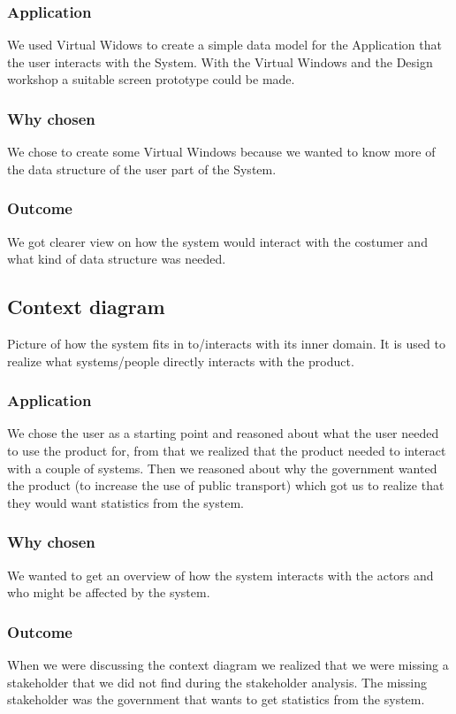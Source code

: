 \documentclass[a4paper]{article}
\begin{document}
      \subsubsection{Application}
        We used Virtual Widows to create a simple data model for the Application that the user interacts with the System. With the Virtual Windows and the Design workshop a suitable screen prototype could be made.
      \subsubsection{Why chosen}
        We chose to create some Virtual Windows because we wanted to know more of the data structure of the user part of the System.
      \subsubsection{Outcome}
        We got clearer view on how the system would interact with the costumer and what kind of data structure was needed.
    \subsection{Context diagram} \label{subsec:context}
	Picture of how the system fits in to/interacts with its inner domain. It is used to realize what systems/people directly interacts with the product.
    \subsubsection{Application}
    We chose the user as a starting point and reasoned about what the user needed to use the product for, from that we realized that the product needed to interact with a couple of systems. Then we reasoned about why the government wanted the product (to increase the use of public transport) which got us to realize that they would want statistics from the system.
    \subsubsection{Why chosen}
    We wanted to get an overview of how the system interacts with the actors and who might be affected by the system.
    \subsubsection{Outcome}
	When we were discussing the context diagram we realized that we were missing a stakeholder that we did not find during the stakeholder analysis. The missing stakeholder was the government that wants to get statistics from the system. 
\end{document}
